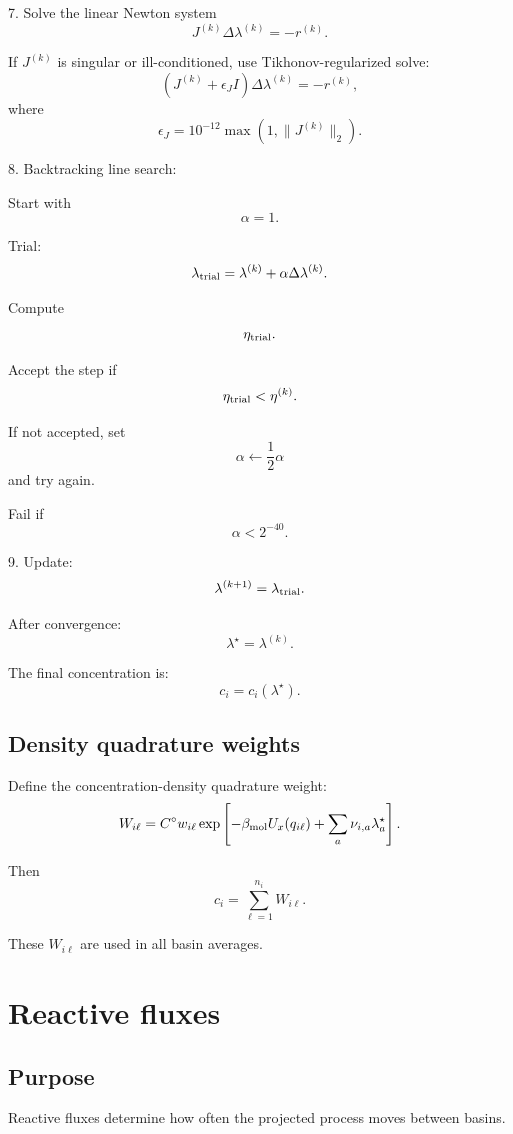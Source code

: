 \documentclass[11pt]{article}
\begin{document}
  7. Solve the linear Newton system
  \[
  J^{(k)}\Delta\lambda^{(k)}=-r^{(k)}.
  \]

  If \(J^{(k)}\) is singular or ill-conditioned, use Tikhonov-regularized solve:
  \[
  \left(J^{(k)}+\epsilon_J I\right)\Delta\lambda^{(k)}=-r^{(k)},
  \]
  where
  \[
  \epsilon_J=10^{-12}\max(1,\|J^{(k)}\|_2).
  \]

  8. Backtracking line search:

  Start with
  \[
  \alpha=1.
  \]

  Trial:
  \[
  \lambda_{\rm trial}=\lambda^{(k)}+\alpha\Delta\lambda^{(k)}.
  \]

  Compute
  \[
  \eta_{\rm trial}.
  \]

  Accept the step if
  \[
  \eta_{\rm trial}<\eta^{(k)}.
  \]

  If not accepted, set
  \[
  \alpha\leftarrow \frac12\alpha
  \]
  and try again.

  Fail if
  \[
  \alpha<2^{-40}.
  \]

  9. Update:
  \[
  \lambda^{(k+1)}=\lambda_{\rm trial}.
  \]

  After convergence:
  \[
  \lambda^\star=\lambda^{(k)}.
  \]

  The final concentration is:
  \[
  c_i=c_i(\lambda^\star).
  \]

  \subsection{Density quadrature weights}

  Define the concentration-density quadrature weight:
  \[
  W_{i\ell}
  =
  C^\circ
  w_{i\ell}
  \exp
  \left[
  -\beta_{\rm mol}U_x(q_{i\ell})
  +
  \sum_a\nu_{i,a}\lambda_a^\star
  \right].
  \]

  Then
  \[
  c_i=\sum_{\ell=1}^{n_i}W_{i\ell}.
  \]

  These \(W_{i\ell}\) are used in all basin averages.

  \section{Reactive fluxes}

  \subsection{Purpose}

  Reactive fluxes determine how often the projected process moves between basins.
\end{document}
